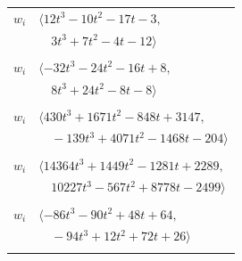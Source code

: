 \documentclass[11pt]{article}
\begin{document}
\begin{longtable}{@{}ll@{}}
$w_i$ & $\langle 12t^{3}-10t^{2}-17t-3,$\\
 & $\quad 3t^{3}+7t^{2}-4t-12\rangle$\\
\addlinespace[2pt]
\multicolumn{2}{@{}p{0.97\textwidth}@{}}{$i=18$, $D_i=4$, $\rho_{ij}$: $4{:}1, \allowbreak 26{:}1, \allowbreak 27{:}2, \allowbreak 37{:}1, \allowbreak 41{:}2, \allowbreak 45{:}2, \allowbreak 63{:}2$}\\
$w_i$ & $\langle -32t^{3}-24t^{2}-16t+8,$\\
 & $\quad 8t^{3}+24t^{2}-8t-8\rangle$\\
\addlinespace[2pt]
\multicolumn{2}{@{}p{0.97\textwidth}@{}}{$i=19$, $D_i=32$, $\rho_{ij}$: $7{:}1, \allowbreak 14{:}1, \allowbreak 25{:}2, \allowbreak 30{:}1, \allowbreak 36{:}1, \allowbreak 37{:}1, \allowbreak 40{:}2, \allowbreak 41{:}1, \allowbreak 42{:}2, \allowbreak 45{:}1, \allowbreak 47{:}2, \allowbreak 56{:}1, \allowbreak 58{:}2$}\\
$w_i$ & $\langle 430t^{3}+1671t^{2}-848t+3147,$\\
 & $\quad -139t^{3}+4071t^{2}-1468t-204\rangle$\\
\addlinespace[2pt]
\multicolumn{2}{@{}p{0.97\textwidth}@{}}{$i=20$, $D_i=64$, $\rho_{ij}$: $0{:}2, \allowbreak 8{:}2, \allowbreak 12{:}2, \allowbreak 14{:}2, \allowbreak 16{:}2, \allowbreak 22{:}2, \allowbreak 28{:}2, \allowbreak 31{:}1, \allowbreak 37{:}1, \allowbreak 39{:}2, \allowbreak 49{:}2, \allowbreak 52{:}2, \allowbreak 53{:}1, \allowbreak 64{:}2, \allowbreak 66{:}1, \allowbreak 71{:}1$}\\
$w_i$ & $\langle 14364t^{3}+1449t^{2}-1281t+2289,$\\
 & $\quad 10227t^{3}-567t^{2}+8778t-2499\rangle$\\
\addlinespace[2pt]
\multicolumn{2}{@{}p{0.97\textwidth}@{}}{$i=21$, $D_i=4$, $\rho_{ij}$: $7{:}1, \allowbreak 13{:}1, \allowbreak 29{:}2, \allowbreak 30{:}2, \allowbreak 33{:}1, \allowbreak 41{:}1, \allowbreak 48{:}1, \allowbreak 49{:}2, \allowbreak 55{:}1, \allowbreak 57{:}2, \allowbreak 59{:}2$}\\
$w_i$ & $\langle -86t^{3}-90t^{2}+48t+64,$\\
 & $\quad -94t^{3}+12t^{2}+72t+26\rangle$\\
\addlinespace[2pt]
\multicolumn{2}{@{}p{0.97\textwidth}@{}}{$i=22$, $D_i=4$, $\rho_{ij}$: $0{:}1, \allowbreak 6{:}2, \allowbreak 8{:}2, \allowbreak 20{:}1, \allowbreak 44{:}2, \allowbreak 51{:}1, \allowbreak 58{:}2, \allowbreak 60{:}2, \allowbreak 66{:}1, \allowbreak 68{:}1, \allowbreak 71{:}2$}\\

\end{longtable}
\end{document}
